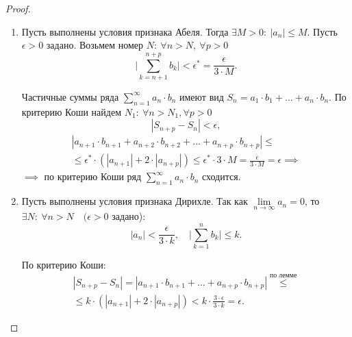 \begin{proof}\leavevmode
    \begin{enumerate}
        \item Пусть выполнены условия признака Абеля. Тогда $\exists M > 0: \ |a_n| \leqslant M$. Пусть $\epsilon > 0$ задано. Возьмем номер $N: \ \forall n > N, \ \forall p > 0$
              \[
                  \bigg|\sum_{k=n+1}^{n+p}b_k\bigg| < \epsilon^* = \frac{\epsilon}{3\cdot M}.
              \]

              Частичные суммы ряда $\sum_{n=1}^{\infty}a_n\cdot b_n$ имеют вид $S_n = a_1\cdot b_1 + \ldots + a_n \cdot b_n$. По критерию Коши найдем $N_1: \ \forall n > N_1, \forall p > 0$
              \[
                  |S_{n+p} - S_n| < \epsilon,
              \]
              \begin{multline*}
                  |a_{n+1} \cdot b_{n+1} + a_{n+2} \cdot b_{n+2} + \ldots + a_{n+p} \cdot b_{n+p}| \leqslant \\
                  \leqslant \epsilon^* \cdot (|a_{n+1}| + 2 \cdot |a_{n+p}|) \leqslant \epsilon^* \cdot 3 \cdot M = \frac{\epsilon}{3 \cdot M} = \epsilon \implies
              \end{multline*}
              $\implies$ по критерию Коши ряд $\sum_{n=1}^{\infty}a_n \cdot b_n$ сходится.

        \item Пусть выполнены условия признака Дирихле. Так как $\underset{n\rightarrow\infty}{\lim}a_n = 0$, то $\exists N: \ \forall n > N \quad (\epsilon > 0$ задано):
              \[
                  |a_n| < \frac{\epsilon}{3 \cdot k}, \quad \bigg|\sum_{k=1}^{n}b_k\bigg| \leqslant k.
              \]

              По критерию Коши:
              \begin{multline*}
                  |S_{n+p} - S_n| = |a_{n+1} \cdot b_{n+1} + \ldots + a_{n+p} \cdot b_{n+p}| \overset{\text{по лемме}}{\leqslant} \\
                  \leqslant k\cdot(|a_{n+1}| + 2\cdot |a_{n+p}|) < k\cdot \frac{3\cdot \epsilon}{3 \cdot k} = \epsilon.
              \end{multline*}
    \end{enumerate}
\end{proof}


